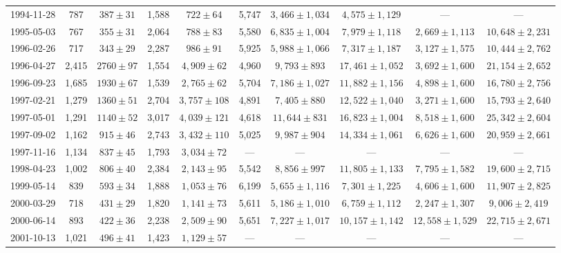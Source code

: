 \begin{landscape}
\begin{longtable}{cccccccccc}
{1994-11-28} & 787 & {$387  \pm  31$} & 1,588 & {$722 \pm 64$} & 5,747 & {$3,466 \pm 1,034$} & {$4,575 \pm 1,129$} & --- & --- \\
{1995-05-03} & 767 & {$355  \pm  31$} & 2,064 & {$788 \pm 83$} & 5,580 & {$6,835 \pm 1,004$} & {$7,979 \pm 1,118$} & {$2,669 \pm 1,113$} & {$10,648 \pm 2,231$} \\
{1996-02-26} & 717 & {$343  \pm  29$} & 2,287 & {$986 \pm 91$} & 5,925 & {$5,988 \pm 1,066$} & {$7,317 \pm 1,187$} & {$3,127 \pm 1,575$} & {$10,444 \pm 2,762$} \\
{1996-04-27} & 2,415 & {$2760  \pm  97$} & 1,554 & {$4,909 \pm 62$} & 4,960 & {$9,793 \pm 893$} & {$17,461 \pm 1,052$} & {$3,692 \pm 1,600$} & {$21,154 \pm 2,652$} \\
{1996-09-23} & 1,685 & {$1930  \pm  67$} & 1,539 & {$2,765 \pm 62$} & 5,704 & {$7,186 \pm 1,027$} & {$11,882 \pm 1,156$} & {$4,898 \pm 1,600$} & {$16,780 \pm 2,756$} \\
{1997-02-21} & 1,279 & {$1360  \pm  51$} & 2,704 & {$3,757 \pm 108$} & 4,891 & {$7,405 \pm 880$} & {$12,522 \pm 1,040$} & {$3,271 \pm 1,600$} & {$15,793 \pm 2,640$} \\
{1997-05-01} & 1,291 & {$1140  \pm  52$} & 3,017 & {$4,039 \pm 121$} & 4,618 & {$11,644 \pm 831$} & {$16,823 \pm 1,004$} & {$8,518 \pm 1,600$} & {$25,342 \pm 2,604$} \\
{1997-09-02} & 1,162 & {$915  \pm  46$} & 2,743 & {$3,432 \pm 110$} & 5,025 & {$9,987 \pm 904$} & {$14,334 \pm 1,061$} & {$6,626 \pm 1,600$} & {$20,959 \pm 2,661$} \\
{1997-11-16} & 1,134 & {$837  \pm  45$} & 1,793 & {$3,034 \pm 72$} & --- & --- & --- & --- & --- \\
{1998-04-23} & 1,002 & {$806  \pm  40$} & 2,384 & {$2,143 \pm 95$} & 5,542 & {$8,856 \pm 997$} & {$11,805 \pm 1,133$} & {$7,795 \pm 1,582$} & {$19,600 \pm 2,715$} \\
{1999-05-14} & 839 & {$593  \pm  34$} & 1,888 & {$1,053 \pm 76$} & 6,199 & {$5,655 \pm 1,116$} & {$7,301 \pm 1,225$} & {$4,606 \pm 1,600$} & {$11,907 \pm 2,825$} \\
{2000-03-29} & 718 & {$431  \pm  29$} & 1,820 & {$1,141 \pm 73$} & 5,611 & {$5,186 \pm 1,010$} & {$6,759 \pm 1,112$} & {$2,247 \pm 1,307$} & {$9,006 \pm 2,419$} \\
{2000-06-14} & 893 & {$422  \pm  36$} & 2,238 & {$2,509 \pm 90$} & 5,651 & {$7,227 \pm 1,017$} & {$10,157 \pm 1,142$} & {$12,558 \pm 1,529$} & {$22,715 \pm 2,671$} \\
{2001-10-13} & 1,021 & {$496  \pm  41$} & 1,423 & {$1,129 \pm 57$} & --- & --- & --- & --- & --- \\

\end{longtable}
\end{landscape}
